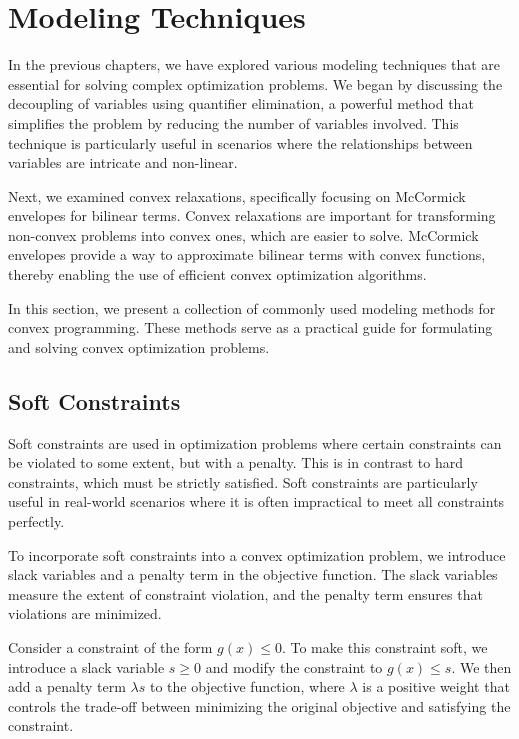 \section{Modeling Techniques} \label{ch:modeling_techniques}

In the previous chapters, we have explored various modeling techniques that are essential for solving complex optimization problems.
We began by discussing the decoupling of variables using quantifier elimination, a powerful method that simplifies the problem by reducing the number
of variables involved.
This technique is particularly useful in scenarios where the relationships between variables are intricate and non-linear.

Next, we examined convex relaxations, specifically focusing on McCormick envelopes for bilinear terms.
Convex relaxations are important for transforming non-convex problems into convex ones, which are easier to solve.
McCormick envelopes provide a way to approximate bilinear terms with convex functions, thereby enabling the use of efficient convex optimization
algorithms.

In this section, we present a collection of commonly used modeling methods for convex programming.
These methods serve as a practical guide for formulating and solving convex optimization problems.

\subsection{Soft Constraints}

Soft constraints are used in optimization problems where certain constraints can be violated to some extent, but with a penalty.
This is in contrast to hard constraints, which must be strictly satisfied.
Soft constraints are particularly useful in real-world scenarios where it is often impractical to meet all constraints perfectly.

To incorporate soft constraints into a convex optimization problem, we introduce slack variables and a penalty term in the objective function.
The slack variables measure the extent of constraint violation, and the penalty term ensures that violations are minimized.

Consider a constraint of the form \( g(x) \leq 0 \).
To make this constraint soft, we introduce a slack variable \( s \geq 0 \) and modify the constraint to \( g(x) \leq s \).
We then add a penalty term \( \lambda s \) to the objective function, where \( \lambda \) is a positive weight that controls the trade-off between
minimizing the original objective and satisfying the constraint.

